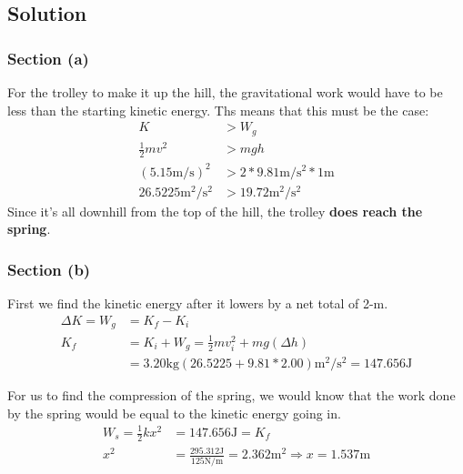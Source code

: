 \documentclass[12pt]{article}
\begin{document}
\subsection*{Solution}
\subsubsection*{Section (a)}
For the trolley to make it up the hill, the gravitational work would have to be less than the starting kinetic energy. Ths means that this must be the case: 
\begin{align*}
    K &> W_g \\ 
    \frac{1}{2}mv^2 &> mgh \\ 
    (5.15\unit{\meter/\second})^2 &> 2*9.81\unit{\meter/\second^2}*1\unit{\meter} \\
    26.5225\unit{\meter^2/\second^2} &> 19.72\unit{\meter^2/\second^2}
\end{align*}
Since it's all downhill from the top of the hill, the trolley \textbf{does reach the spring}.

\subsubsection*{Section (b)}
First we find the kinetic energy after it lowers by a net total of 2-m. 
\begin{align*}
    \Delta K = W_g &= K_f - K_i\\
    K_f &=  K_i + W_g
        =   \frac{1}{2}mv_i^2 + mg(\Delta h)\\
        &=  3.20\unit{\kilo\gram}(26.5225 + 9.81*2.00)\unit{\meter^2/\second^2} = 147.656\unit{\joule}
\end{align*}

For us to find the compression of the spring, we would know that the work done by the spring would be equal to the kinetic energy going in.
\begin{align*}
    W_s = \frac{1}{2}kx^2 &= 147.656\unit{\joule} = K_f\\
    x^2 &= \frac{295.312\unit{\joule}}{125\unit{\newton/\meter}} = 2.362\unit{\meter^2} \Rightarrow x = \boxed{1.537\unit{\meter}}
\end{align*}



\end{document}
